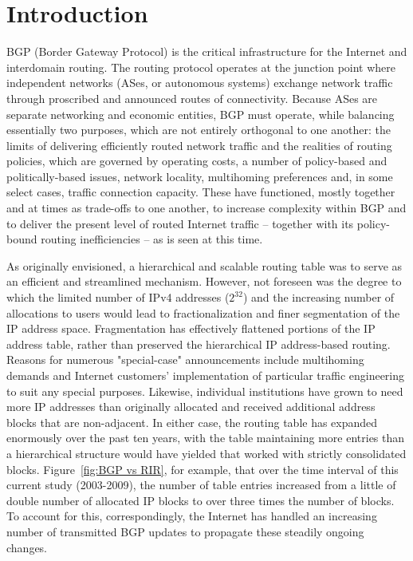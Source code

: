 \section{Introduction}

BGP (Border Gateway Protocol) is the critical infrastructure for the Internet
and interdomain routing. The routing protocol operates at the junction point
where independent networks (ASes, or autonomous systems) exchange network
traffic through proscribed and announced routes of connectivity. Because ASes
are separate networking and economic entities, BGP must operate, while
balancing essentially two purposes, which are not entirely orthogonal to one
another: the limits of delivering efficiently routed network traffic and the
realities of routing policies, which are governed by operating costs, a number
of policy-based and politically-based issues, network locality, multihoming
preferences and, in some select cases, traffic connection capacity. These have
functioned, mostly together and at times as trade-offs to one another, to
increase complexity within BGP and to deliver the present level of routed
Internet traffic -- together with its policy-bound routing inefficiencies --
as is seen at this time.

As originally envisioned, a hierarchical and scalable routing table was to
serve as an efficient and streamlined mechanism. However, not foreseen was the
degree to which the limited number of IPv4 addresses ($2^{32}$) and the
increasing number of allocations to users would lead to fractionalization and
finer segmentation of the IP address space. Fragmentation has effectively
flattened portions of the IP address table, rather than preserved the
hierarchical IP address-based routing. Reasons for numerous "special-case"
announcements include multihoming demands and Internet customers'
implementation of particular traffic engineering to suit any special purposes.
Likewise, individual institutions have grown to need more IP addresses than
originally allocated and received additional address blocks that are
non-adjacent. In either case, the routing table has expanded enormously over
the past ten years, with the table maintaining more entries than a
hierarchical structure would have yielded that worked with strictly
consolidated blocks. Figure~\ref{fig:BGP vs RIR}, for example, that over the
time interval of this current study (2003-2009), the number of table entries
increased from a little of double number of allocated IP blocks to over three
times the number of blocks. To account for this, correspondingly, the Internet
has handled an increasing number of transmitted BGP updates to propagate these
steadily ongoing changes.

